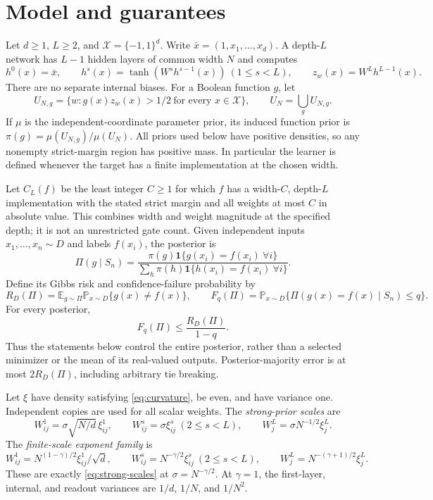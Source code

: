 \documentclass[11pt]{article}
\theoremstyle{remark}\newtheorem{remark}[theorem]{Remark}
\newcommand{\E}{\mathbb E}\newcommand{\Prb}{\mathbb P}\renewcommand{\Pr}{\mathbb P}\newcommand{\R}{\mathbb R}
\begin{document}
\section{Model and guarantees}\label{sec:model}
Let $d\geq1$, $L\geq2$, and $\mathcal X=\{-1,1\}^d$. Write
$\bar x=(1,x_1,\ldots,x_d)$. A depth-$L$ network has $L-1$ hidden layers
of common width $N$ and computes
\[
 h^0(x)=\bar x,\qquad h^s(x)=\tanh(W^s h^{s-1}(x))\ (1\leq s<L),
 \qquad z_w(x)=W^Lh^{L-1}(x).
\]
There are no separate internal biases. For a Boolean function $g$, let
\[
 U_{N,g}=\{w:g(x)z_w(x)>1/2\ \text{for every }x\in\mathcal X\},
 \qquad U_N=\bigcup_g U_{N,g}.
\]
If $\mu$ is the independent-coordinate parameter prior, its induced
function prior is $\pi(g)=\mu(U_{N,g})/\mu(U_N)$. All priors used below
have positive densities, so any nonempty strict-margin region has positive
mass. In particular the learner is defined whenever the target has a
finite implementation at the chosen width.

Let $C_L(f)$ be the least integer $C\geq1$ for which $f$ has a
width-$C$, depth-$L$ implementation with the stated strict margin and all
weights at most $C$ in absolute value. This combines width and weight
magnitude at the specified depth; it is not an unrestricted gate count.
Given independent inputs $x_1,\ldots,x_n\sim D$ and labels $f(x_i)$,
the posterior is
\[
 \Pi(g\mid S_n)=
 \frac{\pi(g)\mathbf1\{g(x_i)=f(x_i)\ \forall i\}}
 {\sum_h\pi(h)\mathbf1\{h(x_i)=f(x_i)\ \forall i\}}.
\]
Define its Gibbs risk and confidence-failure probability by
\[
 R_D(\Pi)=\E_{g\sim\Pi}\Pr_{x\sim D}\{g(x)\ne f(x)\},\qquad
 F_q(\Pi)=\Pr_{x\sim D}\{\Pi(g(x)=f(x)\mid S_n)\leq q\}.
\]
For every posterior,
\begin{equation}\label{eq:confidence}
 F_q(\Pi)\leq\frac{R_D(\Pi)}{1-q}.
\end{equation}
Thus the statements below control the entire posterior, rather than a
selected minimizer or the mean of its real-valued outputs. Posterior-majority
error is at most $2R_D(\Pi)$, including arbitrary tie breaking.

Let $\xi$ have density satisfying \eqref{eq:curvature}, be even, and have
variance one. Independent copies are used for all scalar weights. The
\emph{strong-prior scales} are
\begin{equation}\label{eq:strong-scales}
 W^1_{ij}=\sigma\sqrt{N/d}\,\xi^1_{ij},\qquad
 W^s_{ij}=\sigma\xi^s_{ij}\ (2\leq s<L),\qquad
 W^L_j=\sigma N^{-1/2}\xi^L_j.
\end{equation}
The \emph{finite-scale exponent family} is
\begin{equation}\label{eq:gamma-scales}
 W^1_{ij}=N^{(1-\gamma)/2}\xi^1_{ij}/\sqrt d,\qquad
 W^s_{ij}=N^{-\gamma/2}\xi^s_{ij}\ (2\leq s<L),\qquad
 W^L_j=N^{-(\gamma+1)/2}\xi^L_j.
\end{equation}
These are exactly \eqref{eq:strong-scales} at $\sigma=N^{-\gamma/2}$.
At $\gamma=1$, the first-layer, internal, and readout variances are
$1/d$, $1/N$, and $1/N^2$.
\end{document}
